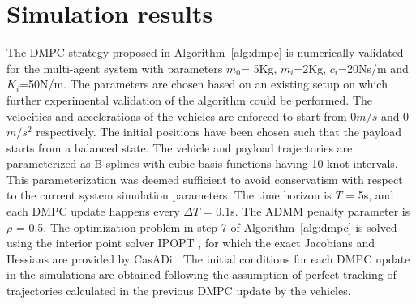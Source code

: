 \documentclass[letterpaper, 10 pt, conference]{ieeeconf}
\begin{document}
\section{Simulation results}
The DMPC strategy proposed in Algorithm~\ref{alg:dmpc} is numerically validated for the multi-agent system with parameters $m_0$= 5Kg, $m_i$=2Kg, $c_i$=20Ns/m and $K_i$=50N/m.
 The parameters are chosen based on an existing setup on which further experimental validation of the algorithm could be performed.
The velocities and accelerations of the vehicles are enforced to start from 0$m/s$ and 0$m/s^2$ respectively. The initial positions have been chosen such that the payload starts from a balanced state. The vehicle and payload trajectories are parameterized as B-splines with cubic basis functions having 10 knot intervals. This parameterization was deemed sufficient to avoid conservatism with respect to the current system simulation parameters. The time horizon is $T$ = 5s, and each DMPC update happens every $\Delta T$ = 0.1s. The ADMM penalty parameter is $\rho$ = 0.5. The optimization problem in step 7 of Algorithm~\ref{alg:dmpc} is solved using the interior point solver IPOPT \cite{c17}, for which the exact Jacobians and Hessians are provided by CasADi \cite{c18}. The initial conditions for each DMPC update in the simulations are obtained following the assumption of perfect tracking of trajectories calculated in the previous DMPC update by the vehicles.
\\
\indent
\end{document}
